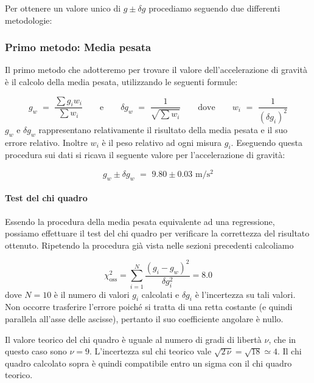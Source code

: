 Per ottenere un valore unico di $g \pm \delta g$ procediamo seguendo due differenti metodologie:

\subsubsection{Primo metodo: Media pesata}

Il primo metodo che adotteremo per trovare il valore dell'accelerazione di gravità è il calcolo della media pesata, utilizzando le seguenti formule:

\begin{equation*}
g_w \,\, = \,\, \frac{\sum g_iw_i}{\sum w_i} \quad\quad \text{e} \quad\quad \delta g_w \,\, = \,\, \frac{1}{\sqrt{\sum w_i}} \quad\quad \text{dove} \quad\quad w_i \,\, = \,\, \frac{1}{(\delta g_i)^2}
\end{equation*}
%
$g_w$ e $\delta g_w$ rappresentano relativamente il risultato della media pesata e il suo errore relativo. Inoltre $w_i$ è il peso relativo ad ogni misura $g_i$.
Eseguendo questa procedura sui dati si ricava il seguente valore per l'accelerazione di gravità:

\begin{equation}
g_w \pm \delta g_w \,\, = \,\, 9.80 \pm 0.03 \,\, \si{\metre\per\square\second}
\end{equation}

\paragraph{Test del chi quadro\\}

Essendo la procedura della media pesata equivalente ad una regressione, possiamo effettuare il test del chi quadro per verificare
la correttezza del risultato ottenuto. Ripetendo la procedura già vista nelle sezioni precedenti calcoliamo

\begin{equation}
    \chi^2_{\text{oss}} = \sum_{i=1}^N \frac{(g_i - g_w)^2}{\delta g_i^2} = 8.0
\end{equation}
%
dove $N = 10$ è il numero di valori $g_i$ calcolati e $\delta g_i$ è l'incertezza su tali valori. Non occorre trasferire
l'errore poiché si tratta di una retta costante (e quindi parallela all'asse delle ascisse), pertanto il suo coefficiente angolare
è nullo.

Il valore teorico del chi quadro è uguale al numero di gradi di libertà $\nu$, che in questo caso sono  $\nu = 9$.
L'incertezza sul chi teorico vale $\sqrt{2\,\nu} = \sqrt{18} \simeq 4$. Il chi quadro calcolato sopra è quindi compatibile entro
un sigma con il chi quadro teorico.

